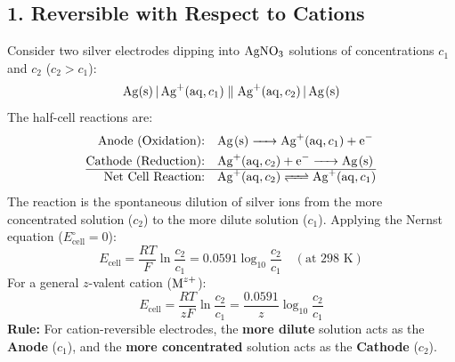 \subsection{1. Reversible with Respect to Cations}
Consider two silver electrodes dipping into $\ce{AgNO3}$ solutions of concentrations $c_1$ and $c_2$ ($c_2 > c_1$):
\begin{equation}
    \ce{Ag(s) | Ag+(aq, } c_1\ce{)} \parallel \ce{Ag+(aq, } c_2\ce{) | Ag(s)}
\end{equation}
The half-cell reactions are:
\begin{align}
    \text{Anode (Oxidation):} \quad & \ce{Ag(s) -> Ag+(aq, } c_1\ce{) + e^-} \\
    \text{Cathode (Reduction):} \quad & \ce{Ag+(aq, } c_2\ce{) + e^- -> Ag(s)} \\
    \hline
    \text{Net Cell Reaction:} \quad & \ce{Ag+(aq, } c_2\ce{) <=> Ag+(aq, } c_1\ce{)}
\end{align}
The reaction is the spontaneous dilution of silver ions from the more concentrated solution ($c_2$) to the more dilute solution ($c_1$).
Applying the Nernst equation ($E^\circ_{\text{cell}} = 0$):
\begin{equation}
    \boxed{E_{\text{cell}} = \frac{RT}{F} \ln \frac{c_2}{c_1} = 0.0591 \log_{10} \frac{c_2}{c_1}} \quad (\text{at } 298\text{ K})
\end{equation}
For a general $z$-valent cation ($\ce{M^{z+}}$):
\begin{equation}
    \boxed{E_{\text{cell}} = \frac{RT}{zF} \ln \frac{c_2}{c_1} = \frac{0.0591}{z} \log_{10} \frac{c_2}{c_1}}
\end{equation}
\textbf{Rule:} For cation-reversible electrodes, the \textbf{more dilute} solution acts as the \textbf{Anode} ($c_1$), and the \textbf{more concentrated} solution acts as the \textbf{Cathode} ($c_2$).

